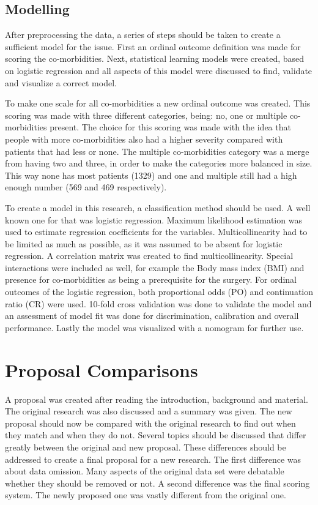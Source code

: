 \documentclass[10pt,a4paper]{article}
\begin{document}
	\subsection{Modelling}
	
	After preprocessing the data, a series of steps should be taken to create a sufficient model for the issue. First an ordinal outcome definition was made for scoring the co-morbidities. Next, statistical learning models were created, based on logistic regression and all aspects of this model were discussed to find, validate and visualize a correct model.
	
	To make one scale for all co-morbidities a new ordinal outcome was created. This scoring was made with three different categories, being: no, one or multiple co-morbidities present. The choice for this scoring was made with the idea that people with more co-morbidities also had a higher severity compared with patients that had less or none. The multiple co-morbidities category was a merge from having two and three, in order to make the categories more balanced in size. This way none has most patients (1329) and one and multiple still had a high enough number (569 and 469 respectively). 
	
	To create a model in this research, a classification method should be used. A well known one for that was logistic regression. Maximum likelihood estimation was used to estimate regression coefficients for the variables. Multicollinearity had to be limited as much as possible, as it was assumed to be absent for logistic regression. A correlation matrix was created to find multicollinearity. Special interactions were included as well, for example the Body mass index (BMI) and presence for co-morbidities as being a prerequisite for the surgery. For ordinal outcomes of the logistic regression, both proportional odds (PO) and continuation ratio (CR) were used. 10-fold cross validation was done to validate the model and an assessment of model fit was done for discrimination, calibration and overall performance. Lastly the model was visualized with a nomogram for further use.
	
	\clearpage
	
	\section{Proposal Comparisons}
	\label{sec:ProposalComparisons}
	
	A proposal was created after reading the introduction, background and material. The original research was also discussed and a summary was given. The new proposal should now be compared with the original research to find out when they match and when they do not. Several topics should be discussed that differ greatly between the original and new proposal. These differences should be addressed to create a final proposal for a new research. The first difference was about data omission. Many aspects of the original data set were debatable whether they should be removed or not. A second difference was the final scoring system. The newly proposed one was vastly different from the original one.
	
\end{document}
